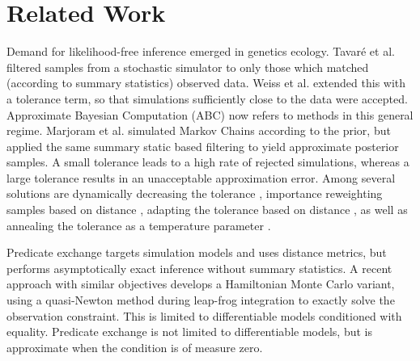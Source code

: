 \section{Related Work}

Demand for likelihood-free inference emerged in genetics ecology.
Tavar{\'e} et al.  
filtered samples from a stochastic simulator to only those which matched (according to summary statistics) observed data. 
Weiss et al.  extended this with a tolerance term, so that simulations sufficiently close to the data were accepted.
Approximate Bayesian Computation (ABC) now refers to methods \cite{beaumont2002approximate,sisson2007sequential} in this general regime.
Marjoram et al.  simulated Markov Chains according to the prior, but applied the same summary static based filtering to yield approximate posterior samples.
A small tolerance leads to a high rate of rejected simulations, whereas a large tolerance results in an unacceptable approximation error.
Among several solutions are dynamically decreasing the tolerance \cite{toni2008approximate}, importance reweighting samples based on distance \cite{wegmann2009efficient}, adapting the tolerance based on distance \cite{del2012adaptive,lenormand2013adaptive}, as well as annealing the tolerance as a temperature parameter \cite{albert2015simulated}.

Predicate exchange targets simulation models and uses distance metrics, but performs asymptotically exact inference without summary statistics.
A recent approach \cite{graham2017asymptotically}  with similar objectives develops a Hamiltonian Monte Carlo variant, using a quasi-Newton method during leap-frog integration to exactly solve the observation constraint.
This is limited to differentiable models conditioned with equality.
Predicate exchange is not limited to differentiable models, but is approximate when the condition is of measure zero.


